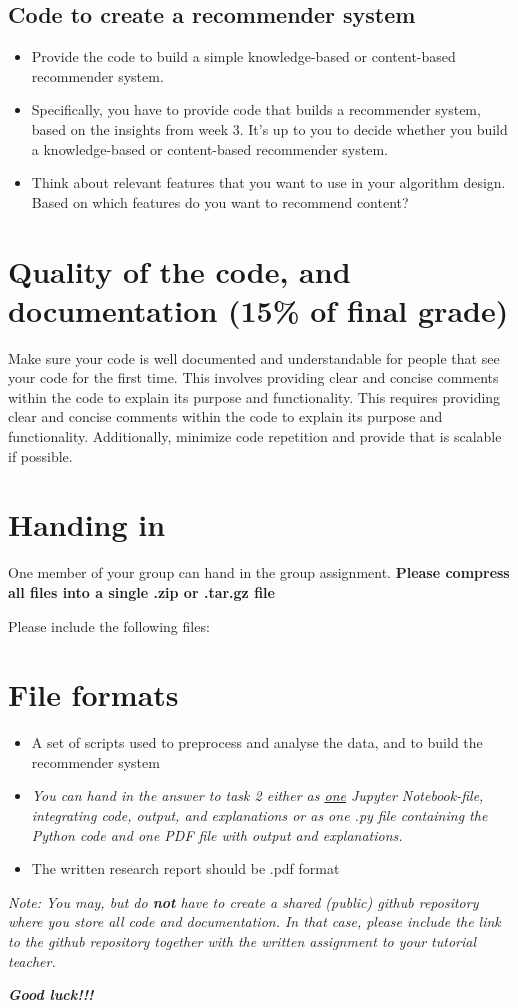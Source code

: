 \subsection{Code to create a recommender system}

\begin{itemize}
	\item Provide the code to build a simple knowledge-based or content-based recommender system. 
	\item Specifically, you have to provide code that builds a recommender system, based on the insights from week 3. It's up to you to decide whether you build a knowledge-based or content-based recommender system.
	\item Think about relevant features that you want to use in your algorithm design. Based on which features do you want to recommend content?
\end{itemize}

\section{Quality of the code, and documentation (15\% of final grade)}

Make sure your code is well documented and understandable for people that see your code for the first time. This involves providing clear and concise comments within the code to explain its purpose and functionality.
This requires providing clear and concise comments within the code to explain its purpose and functionality. Additionally, minimize code repetition and provide that is scalable if possible. 

\section{Handing in}
One member of your group can hand in the group assignment. \textbf{Please compress all files into a single .zip or .tar.gz file} 

Please include the following files:   
\section*{File formats}

\begin{itemize}
	\item  A set of scripts used to preprocess and analyse the data, and to build the recommender system
	\item \emph{
		You can hand in the answer to task 2 \emph{either} as \underline{one} Jupyter Notebook-file, integrating code, output, and explanations \emph{or} as one .py file containing the Python code and one PDF file with output and explanations.
	}
	\item The written research report should be .pdf format
\end{itemize}

\emph{Note: You may, but do \textbf{not} have to create a shared (public) github repository where you store all code and documentation. In that case, please include the link to the github repository together with the written assignment to your tutorial teacher.}

\textbf{\emph{Good luck!!!}}